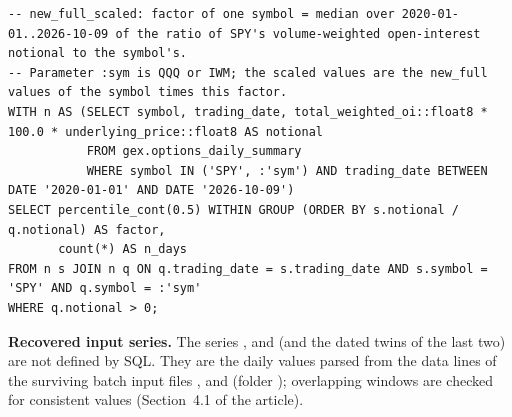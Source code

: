 \begin{lstlisting}[style=appcode]
-- new_full_scaled: factor of one symbol = median over 2020-01-01..2026-10-09 of the ratio of SPY's volume-weighted open-interest notional to the symbol's.
-- Parameter :sym is QQQ or IWM; the scaled values are the new_full values of the symbol times this factor.
WITH n AS (SELECT symbol, trading_date, total_weighted_oi::float8 * 100.0 * underlying_price::float8 AS notional
           FROM gex.options_daily_summary
           WHERE symbol IN ('SPY', :'sym') AND trading_date BETWEEN DATE '2020-01-01' AND DATE '2026-10-09')
SELECT percentile_cont(0.5) WITHIN GROUP (ORDER BY s.notional / q.notional) AS factor,
       count(*) AS n_days
FROM n s JOIN n q ON q.trading_date = s.trading_date AND s.symbol = 'SPY' AND q.symbol = :'sym'
WHERE q.notional > 0;
\end{lstlisting}

\textbf{Recovered input series.} The series ,  and  (and the dated twins of the last two) are not defined by SQL. They are the daily values parsed from the data lines of the surviving batch input files ,  and  (folder ); overlapping windows are checked for consistent values (Section~4.1 of the article).
